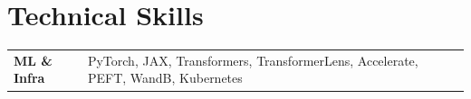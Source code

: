 
\section{Technical Skills}

\begin{tabular}{p{3.0cm} p{15.0cm}}
\textbf{ML \& Infra} & PyTorch, JAX, Transformers, TransformerLens, Accelerate, PEFT, WandB, Kubernetes\\
\end{tabular}
